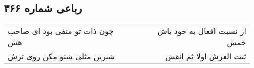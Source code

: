 \begin{center}
\section*{رباعی شماره ۳۶۶}
\label{sec:sh366}
\begin{longtable}{l p{0.5cm} r}
چون ذات تو منفی بود ای صاحب هش
&&
از نسبت افعال به خود باش خمش
\\
شیرین مثلی شنو مکن روی ترش
&&
ثبت العرش اولا ثم انقش
\\
\end{longtable}
\end{center}
